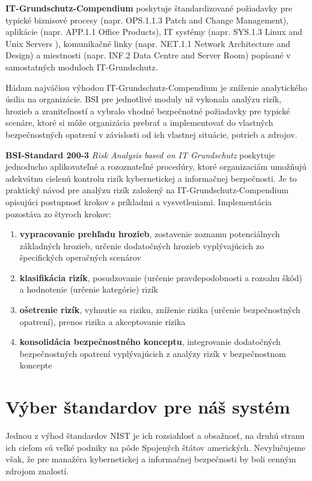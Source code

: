 \textbf{IT-Grundschutz-Compendium} poskytuje štandardizované požiadavky pre typické biznisové procesy (napr. OPS.1.1.3 Patch and Change Management),
aplikácie (napr. APP.1.1 Office Products), IT systémy (napr. SYS.1.3 Linux and Unix Servers ), komunikačné linky (napr. NET.1.1 Network Architecture and Design)
a miestnosti (napr. INF.2 Data Centre and Server Room) popísané v samostatných moduloch IT-Grundschutz.

Hádam najväčiou výhodou IT-Grundschutz-Compendium je zníženie analytického úsilia na organizácie. BSI pre jednotlivé moduly už vykonala  analýzu rizík,
hrozieb a zraniteľností a vybralo vhodné bezpečnotné požiadavky pre typické scenáre, ktoré si môže organizácia prebrať a implementovať do vlastných 
bezpečnostných opatrení v závislosti od ich vlastnej situácie, potrieb a zdrojov.

\textbf{BSI-Standard 200-3} \textit{Risk Analysis based on IT Grundschutz} poskytuje jednoducho aplikovateľné a rozoznateľné procedúry, ktoré organizaciám
umožňujú adekvátnu cielenú kontrolu rizík kybernetickej a informačnej bezpečnosti. Je to praktický návod pre analýzu rizík založený na IT-Grundschutz-Compendium
opisujúci postupnosť krokov s príkladmi a vysvetleniami. Implementácia pozostáva zo štyroch krokov:
\begin{enumerate}
    \item \textbf{vypracovanie prehľadu hrozieb}, zostavenie zoznamu potenciálnych základných hrozieb, určenie dodatočných hrozieb vyplývajúcich zo
    špecifických operačných scenárov
    \item \textbf{klasifikácia rizík}, posudzovanie (určenie pravdepodobnosti a rozsahu škôd) a hodnotenie (určenie kategórie) rizík
    \item \textbf{ošetrenie rizík}, vyhnutie sa riziku, zníženie rizika (určenie bezpečnostných opatrení), prenos rizika a akceptovanie rizika
    \item \textbf{konsolidácia bezpečnostného konceptu}, integrovanie dodatočných bezpečnostných opatrení vyplývajúcich z analýzy rizík v bezpečnostnom koncepte
\end{enumerate}

\section{Výber štandardov pre náš systém}

Jednou z výhod štandardov NIST je ich rozsiahlosť a obsažnosť, na druhú stranu ich cieľom sú veľké podniky na pôde Spojených štátov amerických. Nevylučujeme však,
že pre manažéra kybernetickej a informačnej bezpečnosti by boli cenným zdrojom znalostí.

